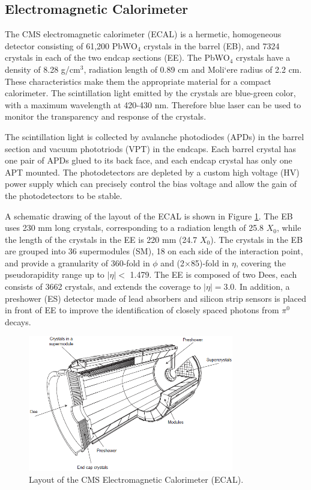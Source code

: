 \documentclass[thesis.tex]{subfiles}
\begin{document}
\subsection{Electromagnetic Calorimeter}
The CMS electromagnetic calorimeter (ECAL) is a hermetic, homogeneous detector consisting of 61,200 PbWO$_4$ crystals in the barrel (EB), and 7324 crystals in each of the two endcap sections (EE). 
The PbWO$_4$ crystals have a density of 8.28 g/cm$^3$, radiation length of 0.89 cm and Moli`ere radius of 2.2 cm. 
These characteristics make them the appropriate material for a compact calorimeter. 
The scintillation light emitted by the crystals are blue-green color, with a maximum wavelength at 420-430 nm. 
Therefore blue laser can be used to monitor the transparency and response of the crystals. 

The scintillation light is collected by avalanche photodiodes (APDs) in the barrel section and vacuum phototriods (VPT) in the endcaps. 
Each barrel crystal has one pair of APDs glued to its back face, and each endcap crystal has only one APT mounted. 
The photodetectors are depleted by a custom high voltage (HV) power supply which can precisely control the bias voltage and allow the gain of the photodetectors to be stable. 

A schematic drawing of the layout of the ECAL is shown in Figure \ref{fig:ecalall}. 
The EB uses 230 mm long crystals, corresponding to a radiation length of 25.8 $X_0$, while the length of the crystals in the EE is 220 mm (24.7 $X_0$). 
The crystals in the EB are grouped into 36 supermodules (SM), 18 on each side of the interaction point, and provide a granularity of 360-fold in $\phi$ and (2$\times$85)-fold in $\eta$, covering the pseudorapidity range up to $|\eta| <$ 1.479. 
The EE is composed of two Dees, each consists of 3662 crystals, and extends the coverage to $|\eta| = $3.0. 
In addition, a preshower (ES) detector made of lead absorbers and silicon strip sensors is placed in front of EE to improve the identification of closely spaced photons from $\pi^0$ decays. 

\begin{figure}[hbt]
	\centering
	\includegraphics[width=0.8\textwidth]{Fig/The-CMS-Electromagnetic-Calorimeter-ECAL-The-barrel-section-comprises-36.png}
	\caption{Layout of the CMS Electromagnetic Calorimeter (ECAL).}
	\label{fig:ecalall}
\end{figure}
\end{document}
